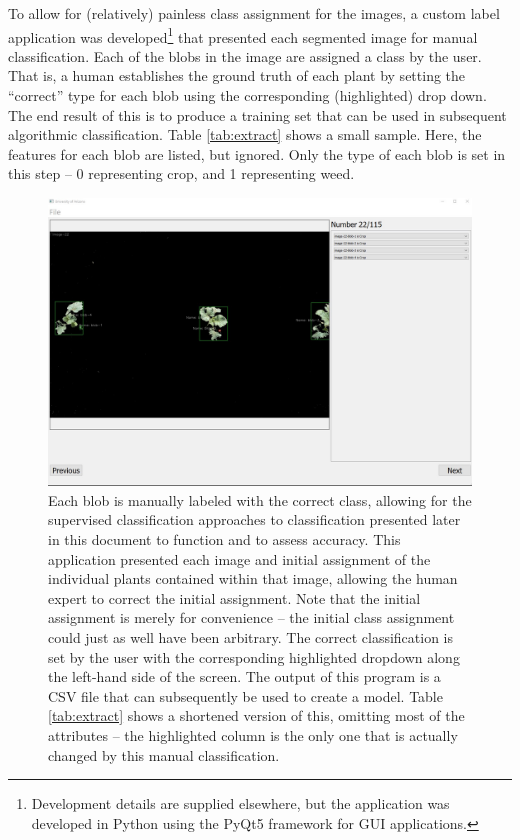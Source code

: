 \documentclass[letterpaper]{article}
\begin{document}
{To allow for (relatively) painless class assignment for the images, a custom label application was developed\footnote{Development details are supplied elsewhere, but the application was developed in Python using the PyQt5 framework for GUI applications.} that presented each segmented image for manual classification. Each of the blobs in the image are assigned a class by the user. That is, a human establishes the ground truth of each plant by setting the ``correct'' type for each blob using the corresponding (highlighted) drop down. The end result of this is to produce a training set that can be used in subsequent algorithmic classification. Table \ref{tab:extract} shows a small sample. Here, the features for each blob are listed, but ignored. Only the type of each blob is set in this step -- 0 representing crop, and 1 representing weed.
\begin{figure}[H]
	\centering
	\includegraphics[scale=0.30]{./figures/review-application.jpg}
	\caption[Manual classification application screenshot]{Each blob is manually labeled with the correct class, allowing for the supervised classification approaches to classification presented later in this document to function and to assess accuracy. This application presented each image and initial assignment of the individual plants contained within that image, allowing the human expert to correct the initial assignment. Note that the initial assignment is merely for convenience -- the initial class assignment could just as well have been arbitrary. The correct classification is set by the user with the corresponding highlighted dropdown along the left-hand side of the screen. The output of this program is a CSV file that can subsequently be used to create a model. Table \ref{tab:extract} shows a shortened version of this, omitting most of the attributes -- the highlighted column is the only one that is actually changed by this manual classification.}
	\label{fig:review-application}
\end{figure}

}
\end{document}
